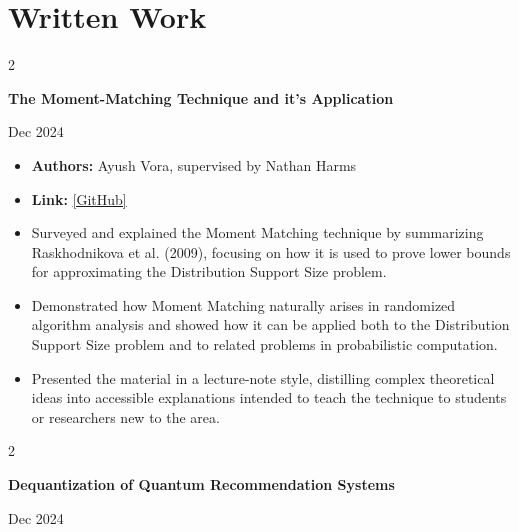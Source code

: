 \documentclass[10pt, letterpaper]{article}
\newenvironment{highlights}{
    \begin{itemize}[
        topsep=0.10 cm,
        parsep=0.10 cm,
        partopsep=0pt,
        itemsep=0pt,
        leftmargin=0 cm + 10pt
    ]
}{
    \end{itemize}
} %
\newenvironment{twocolentry}[2][]{
    \onecolentry
    \def\secondColumn{#2}
    \setcolumnwidth{\fill, 4.5 cm}
    \begin{paracol}{2}
}{
    \switchcolumn \raggedleft \secondColumn
    \end{paracol}
    \endonecolentry
} %
\begin{document}
    
    \section{Written Work}
    \begin{twocolentry}
        {Dec 2024}
        {\textbf{The Moment-Matching Technique and it's Application}}
    \end{twocolentry}
    \vspace{0.10 cm}
    \begin{highlights}
        \item \textbf{Authors:} Ayush Vora, supervised by Nathan Harms
        \item \textbf{Link:} \href{https://github.com/ayushtvora/moment-matching}{[GitHub]}
        \item Surveyed and explained the Moment Matching technique by summarizing Raskhodnikova et al. (2009), focusing on how it is used to prove lower bounds for approximating the Distribution Support Size problem.
        \item Demonstrated how Moment Matching naturally arises in randomized algorithm analysis and showed how it can be applied both to the Distribution Support Size problem and to related problems in probabilistic computation.
        \item Presented the material in a lecture-note style, distilling complex theoretical ideas into accessible explanations intended to teach the technique to students or researchers new to the area.

        
    \end{highlights}
    \vspace{0.20 cm}
    \begin{twocolentry}
        {Dec 2024}
        {\textbf{Dequantization of Quantum Recommendation Systems}}
    \end{twocolentry}
    \vspace{0.10 cm}
\end{document}
